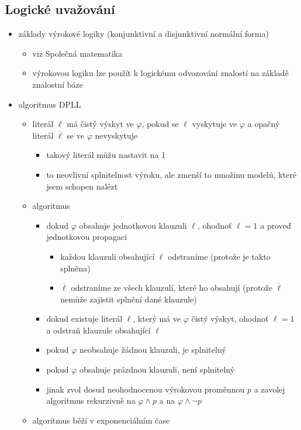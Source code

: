 \subsection{Logické uvažování}
\begin{itemize}
\item základy výrokové logiky (konjunktivní a disjunktivní normální forma)
\begin{itemize}
\item viz Společná matematika
\item výrokovou logiku lze použít k logickému odvozování znalostí na základě znalostní báze
\end{itemize}
\item algoritmus DPLL
\begin{itemize}
\item literál $\ell$ má čistý výskyt ve $\varphi$, pokud se $\ell$ vyskytuje ve $\varphi$ a opačný literál $\overline\ell$ se ve $\varphi$ nevyskytuje
\begin{itemize}
\item takový literál můžu nastavit na 1
\item to neovlivní splnitelnost výroku, ale zmenší to množinu modelů, které jsem schopen nalézt
\end{itemize}
\item algoritmus
\begin{itemize}
\item dokud $\varphi$ obsahuje jednotkovou klauzuli $\ell$, ohodnoť $\ell=1$ a proveď jednotkovou propagaci
\begin{itemize}
\item každou klauzuli obsahující $\ell$ odstraníme (protože je takto splněna)
\item $\overline\ell$ odstraníme ze všech klauzulí, které ho obsahují (protože $\overline\ell$ nemůže zajistit splnění dané klauzule)
\end{itemize}
\item dokud existuje literál $\ell$, který má ve $\varphi$ čistý výskyt, ohodnoť $\ell=1$ a odstraň klauzule obsahující $\ell$
\item pokud $\varphi$ neobsahuje žádnou klauzuli, je splnitelný
\item pokud $\varphi$ obsahuje prázdnou klauzuli, není splnitelný
\item jinak zvol dosud neohodnocenou výrokovou proměnnou $p$ a zavolej algoritmus rekurzivně na $\varphi\land p$ a na $\varphi\land\neg p$
\end{itemize}
\item algoritmus běží v exponenciálním čase

\end{itemize}
\end{itemize}
